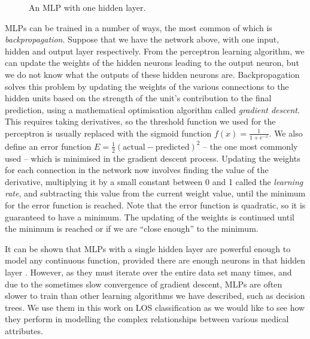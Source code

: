 \begin{figure}[h]
\caption{An MLP with one hidden layer.}
\label{fig:mlp}
\centering
\end{figure}

MLPs can be trained in a number of ways, the most common of which is
\textit{backpropagation}. Suppose that we have the network above, with one
input, hidden and output layer respectively. From the perceptron learning
algorithm, we can update the weights of the hidden neurons leading to the
output neuron, but we do not know what the outputs of these hidden neurons are.
Backpropagation solves this problem by updating the weights of the various
connections to the hidden units based on the strength of the unit's
contribution to the final prediction, using a mathematical optimisation
algorithm called \textit{gradient descent}. This requires taking derivatives,
so the threshold function we used for the perceptron is usually replaced with
the sigmoid function $f(x) = \frac{1}{1+e^{-x}}$. We also define an error
function $E=\frac{1}{2}(\text{actual} - \text{predicted})^2$ -- the one most
commonly used -- which is
minimised in the gradient descent process. Updating the weights for each
connection in the network now involves finding the value of the derivative,
multiplying it by a small constant between 0 and 1 called the
\textit{learning rate}, and subtracting this value from the current weight
value, until the minimum for the error function is reached. Note that the
error function is quadratic, so it is guaranteed to have a minimum. The
updating of the weights is continued until the minimum is reached or if we
are ``close enough'' to the minimum.

It can be shown that MLPs with a single hidden layer are powerful enough to
model any continuous function, provided there are enough neurons in that
hidden layer \cite{Hand2001}. However, as they must iterate over the entire
data set many times, and due to the sometimes slow convergence of gradient
descent, MLPs are often slower to train than other learning algorithms we
have described, such as decision trees. We use them in this work on LOS
classification as we would like to see how they perform in modelling the
complex relationships between various medical attributes.

